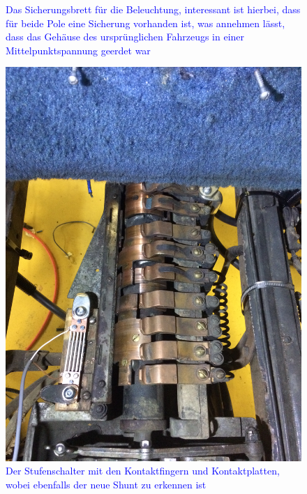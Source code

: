 \begin{landscape}
\begin{figure}[h]
	\caption{\textcolor{blue}{Das Sicherungsbrett für die Beleuchtung, interessant ist hierbei, dass für beide Pole eine Sicherung vorhanden ist, was annehmen lässt, dass das Gehäuse des ursprünglichen Fahrzeugs in einer Mittelpunktspannung geerdet war}}
	\label{fig:Sicherungsbrett_Beleuchtung}
\end{figure}
\begin{figure}[h]
	\centering
		\includegraphics[width=1.30\textwidth]{images/Anhang/Stufenschalter.jpg}
	\caption{\textcolor{blue}{Der Stufenschalter mit den Kontaktfingern und Kontaktplatten, wobei ebenfalls der neue Shunt zu erkennen ist}}
	\label{fig:Stufenschalter_Anhang}
\end{figure}
\begin{figure}[h]
	\centering

\end{figure}
\end{landscape}
